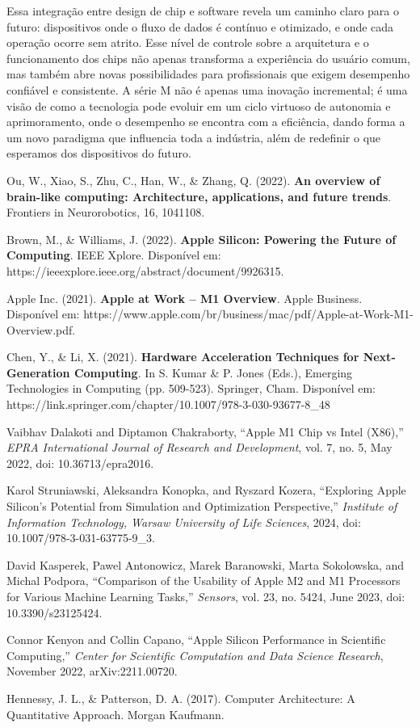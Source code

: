 \documentclass[a4paper,times,12pt]{article}
\begin{document}
Essa integração entre design de chip e software revela um caminho claro para o futuro: dispositivos onde o fluxo de dados é contínuo e otimizado, e onde cada operação ocorre sem atrito. Esse nível de controle sobre a arquitetura e o funcionamento dos chips não apenas transforma a experiência do usuário comum, mas também abre novas possibilidades para profissionais que exigem desempenho confiável e consistente. A série M não é apenas uma inovação incremental; é uma visão de como a tecnologia pode evoluir em um ciclo virtuoso de autonomia e aprimoramento, onde o desempenho se encontra com a eficiência, dando forma a um novo paradigma que influencia toda a indústria, além de redefinir o que esperamos dos dispositivos do futuro.


\newpage
\begin{thebibliography}{00}
 Ou, W., Xiao, S., Zhu, C., Han, W., \& Zhang, Q. (2022). \textbf{An overview of brain-like computing: Architecture, applications, and future trends}. Frontiers in Neurorobotics, 16, 1041108.

 Brown, M., \& Williams, J. (2022). \textbf{Apple Silicon: Powering the Future of Computing}. IEEE Xplore. Disponível em: https://ieeexplore.ieee.org/abstract/document/9926315.

 Apple Inc. (2021). \textbf{Apple at Work – M1 Overview}. Apple Business. Disponível em: https://www.apple.com/br/business/mac/pdf/Apple-at-Work-M1-Overview.pdf.

 Chen, Y., \& Li, X. (2021). \textbf{Hardware Acceleration Techniques for Next-Generation Computing}. In S. Kumar \& P. Jones (Eds.), Emerging Technologies in Computing (pp. 509-523). Springer, Cham. Disponível em: https://link.springer.com/chapter/10.1007/978-3-030-93677-8\_48

Vaibhav Dalakoti and Diptamon Chakraborty, ``Apple M1 Chip vs Intel (X86),'' \textit{EPRA International Journal of Research and Development}, vol. 7, no. 5, May 2022, doi: 10.36713/epra2016.

Karol Struniawski, Aleksandra Konopka, and Ryszard Kozera, ``Exploring Apple Silicon's Potential from Simulation and Optimization Perspective,'' \textit{Institute of Information Technology, Warsaw University of Life Sciences}, 2024, doi: 10.1007/978-3-031-63775-9\_3.

David Kasperek, Pawel Antonowicz, Marek Baranowski, Marta Sokolowska, and Michal Podpora, ``Comparison of the Usability of Apple M2 and M1 Processors for Various Machine Learning Tasks,'' \textit{Sensors}, vol. 23, no. 5424, June 2023, doi: 10.3390/s23125424.

Connor Kenyon and Collin Capano, ``Apple Silicon Performance in Scientific Computing,'' \textit{Center for Scientific Computation and Data Science Research}, November 2022, arXiv:2211.00720.

Hennessy, J. L., \& Patterson, D. A. (2017). Computer Architecture: A Quantitative Approach. Morgan Kaufmann.
\end{thebibliography}
\end{document}
